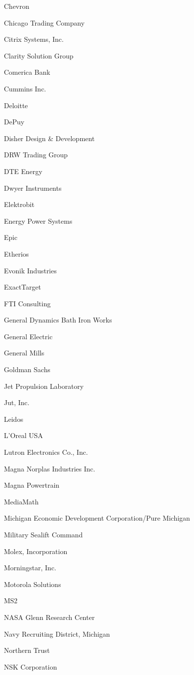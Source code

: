 \documentclass[twoside]{article}
\begin{document}
\begin{center}
\begin{multicols}{5}
\begin{FlushLeft}
\begin{compactitem}
\item Chevron
\item Chicago Trading Company
\item Citrix Systems, Inc.
\item Clarity Solution Group
\item Comerica Bank
\item Cummins Inc.
\item Deloitte
\item DePuy
\item Disher Design \& Development
\item DRW Trading Group
\item DTE Energy
\item Dwyer Instruments
\item Elektrobit
\item Energy Power Systems
\item Epic
\item Etherios
\item Evonik Industries
\item ExactTarget
\item FTI Consulting
\item General Dynamics Bath Iron Works
\item General Electric
\item General Mills
\item Goldman Sachs
\item Jet Propulsion Laboratory
\item Jut, Inc.
\item Leidos
\item L'Oreal USA
\item Lutron Electronics Co., Inc.
\item Magna Norplas Industries Inc.
\item Magna Powertrain
\item MediaMath
\item Michigan Economic Development Corporation/Pure Michigan
\item Military Sealift Command
\item Molex, Incorporation
\item Morningstar, Inc.
\item Motorola Solutions
\item MS2
\item NASA Glenn Research Center
\item Navy Recruiting District, Michigan
\item Northern Trust
\item NSK Corporation

\end{compactitem}
\end{FlushLeft}
\end{multicols}
\end{center}
\end{document}
